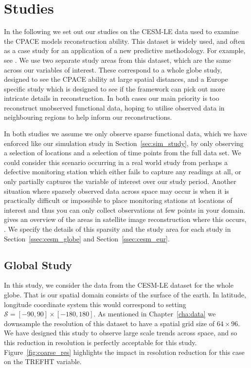 \section{Studies \label{sec:cesm_study}}
In the following we set out our studies on the CESM-LE data used to examine the CPACE models reconstruction ability.
This dataset is widely used, and often as a case study for an application of a new predictive methodology.
For example, see \citep{hu_stochastic_2022}.
We use two separate study areas from this dataset, which are the same across our variables of interest.
These correspond to a whole globe study, designed to see the CPACE ability at large spatial distances, and a Europe specific study which is designed to see if the framework can pick out more intricate details in reconstruction. 
In both cases our main priority is too reconstruct unobserved functional data, hoping to utilise observed data in neighbouring regions to help inform our reconstructions.

In both studies we assume we only observe sparse functional data, which we have enforced like our simulation study in Section~\ref{sec:sim_study}, by only observing a selection of locations and a selection of time points from the full data set.
We could consider this scenario occurring in a real world study from perhaps a defective monitoring station which either fails to capture any readings at all, or only partially captures the variable of interest over our study period.
Another situation where sparsely observed data across space may occur is when it is practically difficult or impossible to place monitoring stations at locations of interest and thus you can only collect observations at few points in your domain.
\citeauthor{shen_missing_2015} gives an overview of the areas in satellite image reconstruction where this occurs, \citep{shen_missing_2015}.
We specify the details of this sparsity and the study area for each study in Section~\ref{ssec:cesm_globe} and Section~\ref{ssec:cesm_eur}.

\subsection{Global Study \label{ssec:cesm_globe}}
In this study, we consider the data from the CESM-LE dataset for the whole globe.
That is our spatial domain consists of the surface of the earth. In latitude, longitude coordinate system this would correspond to setting $\mathcal{S} = \left[-90, 90\right] \times \left[-180, 180\right]$.
As mentioned in Chapter~\ref{cha:data} we downsample the resolution of this dataset to have  a spatial grid size of $64 \times 96$.
We have designed this study to observe large scale trends across space, and so this reduction in resolution is perfectly acceptable for this study.
Figure~\ref{fig:coarse_res} highlights the impact in resolution reduction for this case on the TREFHT variable.

